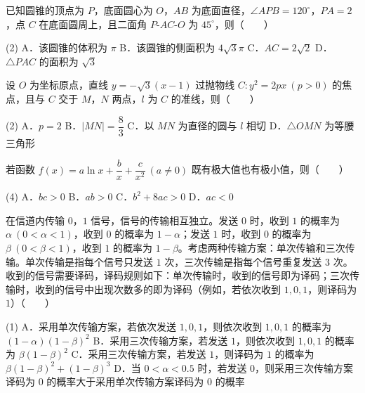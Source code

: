 \begin{question}
已知圆锥的顶点为 $P$，底面圆心为 $O$，$AB$ 为底面直径，$\angle APB=120^\circ$，$PA=2$，点 $C$ 在底面圆周上，且二面角 $P\text{-}AC\text{-}O$ 为 $45^\circ$，则（　　）

\begin{gkopts}(2)
\task A．该圆锥的体积为 $\pi$
\task B．该圆锥的侧面积为 $4\sqrt3\pi$
\task C．$AC=2\sqrt2$
\task D．$\triangle PAC$ 的面积为 $\sqrt3$
\end{gkopts}

\end{question}
\begin{question}
设 $O$ 为坐标原点，直线 $y=-\sqrt3(x-1)$ 过抛物线 $C:y^{2}=2px\ (p>0)$ 的焦点，且与 $C$ 交于 $M$，$N$ 两点，$l$ 为 $C$ 的准线，则（　　）

\begin{gkopts}(2)
\task A．$p=2$
\task B．$|MN|=\dfrac83$
\task C．以 $MN$ 为直径的圆与 $l$ 相切
\task D．$\triangle OMN$ 为等腰三角形
\end{gkopts}

\end{question}
\begin{question}
若函数 $f(x)=a\ln x+\dfrac bx+\dfrac c{x^{2}}\ (a\ne0)$ 既有极大值也有极小值，则（　　）

\begin{gkopts}(4)
\task A．$bc>0$
\task B．$ab>0$
\task C．$b^{2}+8ac>0$
\task D．$ac<0$
\end{gkopts}

\end{question}
\begin{question}
在信道内传输 $0$，$1$ 信号，信号的传输相互独立。发送 $0$ 时，收到 $1$ 的概率为 $\alpha\ (0<\alpha<1)$，收到 $0$ 的概率为 $1-\alpha$；发送 $1$ 时，收到 $0$ 的概率为 $\beta\ (0<\beta<1)$，收到 $1$ 的概率为 $1-\beta$。考虑两种传输方案：单次传输和三次传输。单次传输是指每个信号只发送 $1$ 次，三次传输是指每个信号重复发送 $3$ 次。收到的信号需要译码，译码规则如下：单次传输时，收到的信号即为译码；三次传输时，收到的信号中出现次数多的即为译码（例如，若依次收到 $1,0,1$，则译码为 $1$）（　　）

\begin{gkopts}(1)
\task A．采用单次传输方案，若依次发送 $1,0,1$，则依次收到 $1,0,1$ 的概率为 $(1-\alpha)(1-\beta)^{2}$
\task B．采用三次传输方案，若发送 $1$，则依次收到 $1,0,1$ 的概率为 $\beta(1-\beta)^{2}$
\task C．采用三次传输方案，若发送 $1$，则译码为 $1$ 的概率为 $\beta(1-\beta)^{2}+(1-\beta)^{3}$
\task D．当 $0<\alpha<0.5$ 时，若发送 $0$，则采用三次传输方案译码为 $0$ 的概率大于采用单次传输方案译码为 $0$ 的概率
\end{gkopts}

\par\medskip

\end{question}

